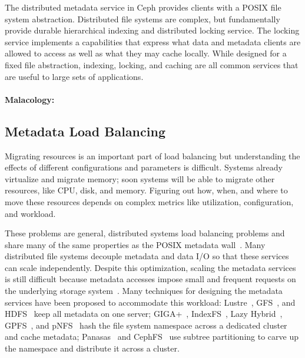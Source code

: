 \documentclass[10pt,twocolumn]{article}
\begin{document}
The distributed metadata service in Ceph provides clients with a POSIX file
system abstraction. Distributed file systems are complex, but fundamentally
provide durable hierarchical indexing and distributed locking service.  The
locking service implements a capabilities that express what data and metadata
clients are allowed to access as well as what they may cache locally.  While
designed for a fixed file abstraction, indexing, locking, and caching are all
common services that are useful to large sets of applications.

\paragraph*{Malacology:}

\subsection{Metadata Load Balancing}

Migrating resources is an important part of load balancing but understanding the effects of different configurations and parameters is difficult. Systems already virtualize and migrate memory; soon systems will be able to migrate other resources, like CPU, disk, and memory. Figuring out how, when, and where to move these resources depends on complex metrics like utilization, configuration, and workload.

These problems are general, distributed systems load balancing problems and share many of the same properties as the POSIX metadata wall~\cite{alam:pdsw2011-metadata-scaling,ghemawat:sosp2003-gfs,hildebrand:msst2005-pnfs,weil_ceph_2006,welch:fast2008-panasas,shvachko:login2012-hdfs-scalability}. Many distributed file systems decouple metadata and data I/O so that
these services can scale independently. Despite
this optimization, scaling the metadata services is still difficult
because metadata accesses impose small and frequent requests on the
underlying storage system~\cite{roselli:atec2000-FS-workloads}. Many
techniques for designing the metadata services have been proposed to
accommodate this workload: Lustre~\cite{konstantinos:pdsw2014-lustre-metadata}, GFS~\cite{ghemawat:sosp2003-gfs}, and HDFS~\cite{shvachko:login2012-hdfs-scalability} keep all metadata on one
server; GIGA+~\cite{patil:fast2011-giga}, IndexFS~\cite{ren:sc2014-indexfs}, Lazy Hybrid~\cite{brandt:msst2003-lh}, GPFS~\cite{schmuck:fast2002-gpfs},
and pNFS~\cite{hildebrand:supercomputing2006-pNFS} hash the file
system namespace across a dedicated cluster and cache metadata; Panasas~\cite{welch:fast2008-panasas} and CephFS~\cite{weil:sc2004-dyn-metadata} use subtree partitioning to carve up the namespace and distribute it across a cluster.
\end{document}
